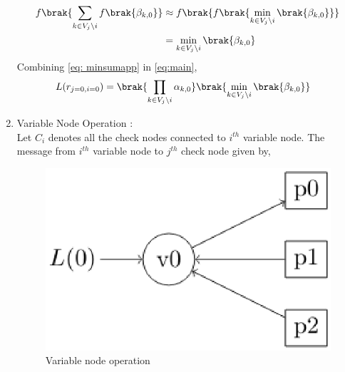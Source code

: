 \documentclass[journal,12pt,twocolumn]{IEEEtran}
\begin{document}
\begin{enumerate}
\begin{align}
f\brak{\sum_{k \in V_j \setminus i}f\brak{\beta_{k,0}}} &\approx f\brak{f\brak{\min_{k \in V_j \setminus i}\brak{\beta_{k,0}}}}\\
&=\min_{k \in V_j \setminus i}\brak{\beta_{k,0}} \label{eq: minsumapp}
\end{align}
Combining \eqref{eq: minsumapp} in \eqref{eq:main},
\begin{align}
L(r_{j=0,i=0}) &=\brak{\prod_{k \in V_j \setminus i}\alpha_{k,0}} \brak{\min_{k \in V_j \setminus i}\brak{\beta_{k,0}}} \label{eq:rji}
\end{align}
%
\item Variable Node Operation :\\
Let ${C_i}$ denotes all the check nodes connected to $i^{th}$ variable node. The message from $i^{th}$ variable node to  $j^{th}$ check node given by,
\begin{figure}[!ht]
\begin{center}
%
%    
%
%    
%
%
%
%
%
%
%
\includegraphics[width=\columnwidth]{./figs/varope}
\end{center}
\caption{Variable node operation}
\label{fig : var}
\end{figure}

\end{enumerate}
\end{document}
